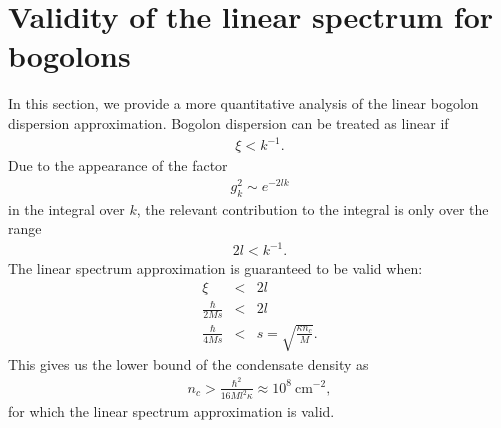 \section{Validity of the linear spectrum for bogolons}
In this section, we provide a more quantitative analysis of the linear bogolon dispersion approximation.
Bogolon dispersion can be treated as linear if
\begin{eqnarray}
\xi < k^{-1}.
\end{eqnarray}
%
Due to the appearance of the factor
%
\begin{eqnarray}
g_k^2\sim e^{-2lk}
\end{eqnarray}
%
in the integral over $k$, the relevant contribution to the integral is only over the range
%
\begin{eqnarray}
2l<k^{-1}.
\end{eqnarray}
%
The linear spectrum approximation is guaranteed to be valid when:
\begin{eqnarray}
\xi &<& 2l\nonumber\\
\frac{\hbar}{2Ms}&<&2l\nonumber\\
\frac{\hbar}{4Ms}&<&s=\sqrt{\frac{\kappa n_c}{M}}.
\end{eqnarray}
%
This gives us the lower bound of the condensate density as
%
\begin{eqnarray}
n_c>\frac{\hbar^2}{16Ml^2\kappa}\approx 10^8~ \mbox{cm}^{-2},
\end{eqnarray}
%
for which the linear spectrum approximation is valid.
